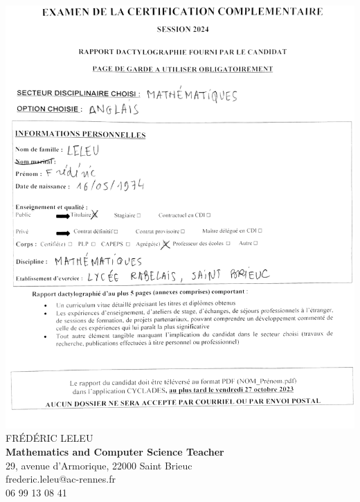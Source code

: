 \documentclass[12pt,a4paper,article,english,firamath]{nsi}
\begin{document}
\includegraphics[width=17cm]{img/garde.png}
\newpage
{\Large\titlefont FRÉDÉRIC LELEU}\\
{\color{UGLiBlue}\textbf{Mathematics and Computer Science Teacher}}\\

{\color{UGLiBlue}\faEnvelope} 29, avenue d'Armorique, 22000 Saint Brieuc\\
{\color{UGLiBlue}\faAt} frederic.leleu@ac-rennes.fr\\
{\color{UGLiBlue}\faPhone*} 06 99 13 08 41\\

\end{document}
